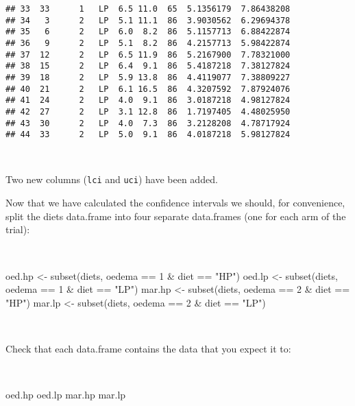 \documentclass[
  12pt,
  a4paper]{book}
\newenvironment{Shaded}{\begin{snugshade}}{\end{snugshade}}
\newcommand{\DecValTok}[1]{\textcolor[rgb]{0.00,0.00,0.81}{#1}}
\newcommand{\FunctionTok}[1]{\textcolor[rgb]{0.00,0.00,0.00}{#1}}
\newcommand{\NormalTok}[1]{#1}
\newcommand{\OtherTok}[1]{\textcolor[rgb]{0.56,0.35,0.01}{#1}}
\newcommand{\SpecialCharTok}[1]{\textcolor[rgb]{0.00,0.00,0.00}{#1}}
\newcommand{\StringTok}[1]{\textcolor[rgb]{0.31,0.60,0.02}{#1}}
\begin{document}
\begin{verbatim}
## 33  33      1   LP  6.5 11.0  65  5.1356179  7.86438208
## 34   3      2   LP  5.1 11.1  86  3.9030562  6.29694378
## 35   6      2   LP  6.0  8.2  86  5.1157713  6.88422874
## 36   9      2   LP  5.1  8.2  86  4.2157713  5.98422874
## 37  12      2   LP  6.5 11.9  86  5.2167900  7.78321000
## 38  15      2   LP  6.4  9.1  86  5.4187218  7.38127824
## 39  18      2   LP  5.9 13.8  86  4.4119077  7.38809227
## 40  21      2   LP  6.1 16.5  86  4.3207592  7.87924076
## 41  24      2   LP  4.0  9.1  86  3.0187218  4.98127824
## 42  27      2   LP  3.1 12.8  86  1.7197405  4.48025950
## 43  30      2   LP  4.0  7.3  86  3.2128208  4.78717924
## 44  33      2   LP  5.0  9.1  86  4.0187218  5.98127824
\end{verbatim}

~

Two new columns (\texttt{lci} and \texttt{uci}) have been added.

Now that we have calculated the confidence intervals we should, for convenience, split the diets data.frame
into four separate data.frames (one for each arm of the trial):

~

\begin{Shaded}
\begin{Highlighting}[]
\NormalTok{oed.hp }\OtherTok{\textless{}{-}} \FunctionTok{subset}\NormalTok{(diets, oedema }\SpecialCharTok{==} \DecValTok{1} \SpecialCharTok{\&}\NormalTok{ diet }\SpecialCharTok{==} \StringTok{"HP"}\NormalTok{)}
\NormalTok{oed.lp }\OtherTok{\textless{}{-}} \FunctionTok{subset}\NormalTok{(diets, oedema }\SpecialCharTok{==} \DecValTok{1} \SpecialCharTok{\&}\NormalTok{ diet }\SpecialCharTok{==} \StringTok{"LP"}\NormalTok{)}
\NormalTok{mar.hp }\OtherTok{\textless{}{-}} \FunctionTok{subset}\NormalTok{(diets, oedema }\SpecialCharTok{==} \DecValTok{2} \SpecialCharTok{\&}\NormalTok{ diet }\SpecialCharTok{==} \StringTok{"HP"}\NormalTok{)}
\NormalTok{mar.lp }\OtherTok{\textless{}{-}} \FunctionTok{subset}\NormalTok{(diets, oedema }\SpecialCharTok{==} \DecValTok{2} \SpecialCharTok{\&}\NormalTok{ diet }\SpecialCharTok{==} \StringTok{"LP"}\NormalTok{)}
\end{Highlighting}
\end{Shaded}

~

Check that each data.frame contains the data that you expect it to:

~

\begin{Shaded}
\begin{Highlighting}[]
\NormalTok{oed.hp}
\NormalTok{oed.lp}
\NormalTok{mar.hp}
\NormalTok{mar.lp}
\end{Highlighting}
\end{Shaded}
\end{document}
